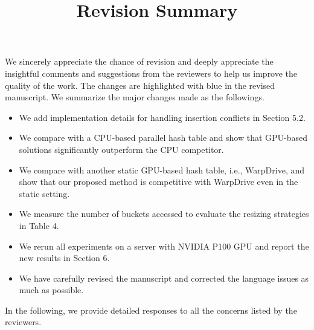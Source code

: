 \documentclass[11pt]{article}
\begin{document}
\title{Revision Summary}
\date{}
\maketitle


\noindent We sincerely appreciate the chance of revision and deeply appreciate the insightful comments and suggestions from the reviewers to help us improve the quality of the work. The changes are highlighted with blue in the revised manuscript. We summarize the major changes made as the followings. 
\begin{itemize}
	\item We add implementation details for handling insertion conflicts in Section 5.2.
	\item We compare with a CPU-based parallel hash table and show that GPU-based solutions significantly outperform the CPU competitor. 
	\item We compare with another static GPU-based hash table, i.e., WarpDrive, and show that our proposed method is competitive with WarpDrive even in the static setting. 
	\item We measure the number of buckets accessed to evaluate the resizing strategies in Table 4.
	\item We rerun all experiments on a server with NVIDIA P100 GPU and report the new results in Section 6.
	\item We have carefully revised the manuscript and corrected the language issues as much as possible. 
\end{itemize}
%
In the following, we provide detailed responses to all the concerns listed by the reviewers.







%


\end{document}
